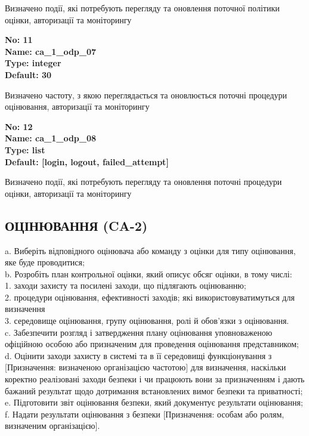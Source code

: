 \documentclass{article}
\begin{document}
{\footnotesize Визначено події, які потребують перегляду та оновлення поточної політики оцінки, авторизації та моніторингу}


{\footnotesize\bfseries
No: 11\\
Name: ca\_\allowbreak{}1\_\allowbreak{}odp\_\allowbreak{}07\\
Type: integer\\
Default: 30
}

{\footnotesize Визначено частоту, з якою переглядається та оновлюється поточні процедури оцінювання, авторизації та моніторингу}


{\footnotesize\bfseries
No: 12\\
Name: ca\_\allowbreak{}1\_\allowbreak{}odp\_\allowbreak{}08\\
Type: list\\
Default: [\textquotedbl{}login\textquotedbl{}, \textquotedbl{}logout\textquotedbl{}, \textquotedbl{}failed\_\allowbreak{}attempt\textquotedbl{}]
}

{\footnotesize Визначено події, які потребують перегляду та оновлення поточні процедури оцінки, авторизації та моніторингу}




\subsection{ОЦІНЮВАННЯ (CA-2)}
a. Виберіть відповідного оцінювача або команду з оцінки для типу оцінювання, яке буде проводитися;\\ 
b. Розробіть план контрольної оцінки, який описує обсяг оцінки, в тому числі:\\ 
1. заходи захисту та посилені заходи, що підлягають оцінюванню;\\ 
2. процедури оцінювання, ефективності заходів; які використовуватимуться для визначення\\ 
3. середовище оцінювання, групу оцінювання, ролі й обов'язки з оцінювання.\\ 
c. Забезпечити розгляд і затвердження плану оцінювання уповноваженою офіційною особою або призначеним для проведення оцінювання представником;\\ 
d. Оцінити заходи захисту в системі та в її середовищі функціонування з [Призначення: визначеною організацією частотою] для визначення, наскільки коректно реалізовані заходи безпеки і чи працюють вони за призначенням і дають бажаний результат щодо дотримання встановлених вимог безпеки та приватності;\\ 
e. Підготовити звіт оцінювання безпеки, який документує результати оцінювання;\\ 
f. Надати результати оцінювання з безпеки [Призначення: особам або ролям, визначеним організацією].
\end{document}
